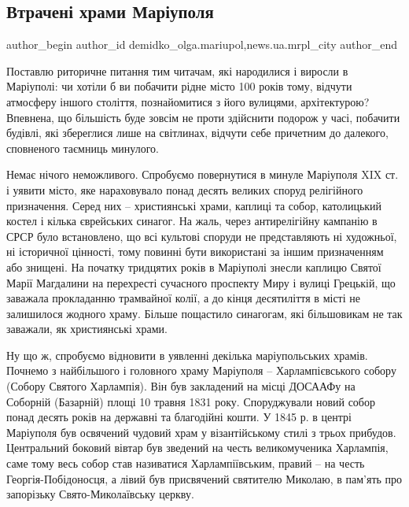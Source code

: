  
 
 
 
 
 
\subsection{Втрачені храми Маріуполя}
\label{sec:16_03_2018.stz.news.ua.mrpl_city.1.vtracheni_hramy}
 
\ifcmt
 author_begin
   author_id demidko_olga.mariupol,news.ua.mrpl_city
 author_end
\fi

Поставлю риторичне питання тим читачам, які народилися і виросли в Маріуполі:
чи хотіли б ви побачити рідне місто 100 років тому, відчути атмосферу іншого
століття, познайомитися з його вулицями, архітектурою? Впевнена, що більшість
буде зовсім не проти здійснити подорож у часі, побачити будівлі, які збереглися
лише на світлинах, відчути себе причетним до далекого, сповненого таємниць
минулого.


Немає нічого неможливого. Спробуємо повернутися в минуле Маріуполя XIX ст. і
уявити місто, яке нараховувало понад десять великих споруд релігійного
призначення. Серед них – християнські храми, каплиці та собор, католицький
костел і кілька єврейських синагог. На жаль, через антирелігійну кампанію в
СРСР було встановлено, що всі культові споруди не представляють ні художньої,
ні історичної цінності, тому повинні бути використані за іншим призначенням або
знищені. На початку тридцятих років в Маріуполі знесли каплицю Святої Марії
Магдалини на перехресті сучасного проспекту Миру і вулиці Грецькій, що заважала
прокладанню трамвайної колії, а до кінця десятиліття в місті не залишилося
жодного храму. Більше пощастило синагогам, які більшовикам не так заважали, як
християнські храми.


Ну що ж, спробуємо відновити в уявленні декілька маріупольських храмів.
Почнемо з найбільшого і головного храму Маріуполя – Харлампієвського собору
(Собору Святого Харлампія). Він був закладений на місці ДОСААФу на Соборній
(Базарній) площі 10 травня 1831 року. Споруджували новий собор понад десять
років на державні та благодійні кошти. У 1845 р. в центрі Маріуполя був
освячений чудовий храм у візантійському стилі з трьох прибудов. Центральний
боковий вівтар був зведений на честь великомученика Харлампія, саме тому весь
собор став називатися Харлампіївським, правий – на честь Георгія-Побідоносця, а
лівий був присвячений святителю Миколаю, в пам'ять про запорізьку
Свято-Миколаївську церкву.

